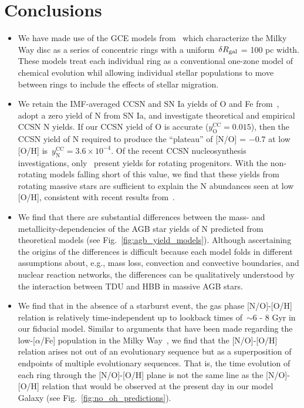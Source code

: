 \documentclass[ms.tex]{subfiles}
\begin{document}
 

\section{Conclusions} 
\label{sec:conclusions} 

\begin{itemize} 
	\item We have made use of the GCE models from~\citet{Johnson2021} which 
	characterize the Milky Way disc as a series of concentric rings with a 
	uniform~$\delta R_\text{gal}$ = 100 pc width. 
	These models treat each individual ring as a conventional one-zone model 
	of chemical evolution whil allowing individual stellar populations to move 
	between rings to include the effects of stellar migration. 

	\item We retain the IMF-averaged CCSN and SN Ia yields of O and Fe 
	from~\citet{Johnson2021}, adopt a zero yield of N from SN Ia, and 
	investigate theoretical and empirical CCSN N yields. 
	If our CCSN yield of O is accurate ($y_\text{O}^\text{CC} = 0.015$), then 
	the CCSN yield of N required to produce the ``plateau'' of [N/O] = $-0.7$ 
	at low [O/H] is~$y_\text{N}^\text{CC} = 3.6\times10^{-4}$. 
	Of the recent CCSN nucleosynthesis investigations, only~\citet{Limongi2018} 
	present yields for rotating progenitors. 
	With the non-rotating models falling short of this value, we find that 
	these yields from rotating massive stars are sufficient to explain the 
	N abundances seen at low [O/H], consistent with recent results 
	from~\citet{Grisoni2021}. 

	\item We find that there are substantial differences between the mass- and 
	metallicity-dependencies of the AGB star yields of N predicted from 
	theoretical models (see Fig.~\ref{fig:agb_yield_models}). 
	Although ascertaining the origins of the differences is difficult because 
	each model folds in different assumptions about, e.g., mass loss, 
	convection and convective boundaries, and nuclear reaction networks, the 
	differences can be qualitatively understood by the interaction between 
	TDU and HBB in massive AGB stars. 

	\item We find that in the absence of a starburst event, the gas phase 
	[N/O]-[O/H] relation is relatively time-independent up to lookback times 
	of~$\sim$6 - 8 Gyr in our fiducial model. 
	Similar to arguments that have been made regarding the low-[$\alpha$/Fe] 
	population in the Milky Way~\citep[e.g.][]{Schoenrich2009, Sharma2020, 
	Johnson2021}, we find that the [N/O]-[O/H] relation arises not out of an 
	evolutionary sequence but as a superposition of endpoints of multiple 
	evolutionary sequences. 
	That is, the time evolution of each ring through the [N/O]-[O/H] plane is 
	not the same line as the [N/O]-[O/H] relation that would be observed at the 
	present day in our model Galaxy (see Fig.~\ref{fig:no_oh_predictions}). 


\end{itemize}
\end{document}
